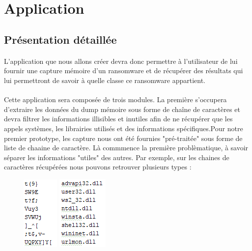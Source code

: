 \documentclass[a4paper, 12pt, twoside]{article}
\begin{document}
\section{Application}
\subsection{Présentation détaillée}

\paragraph{}
L'application que nous allons créer devra donc permettre à l'utilisateur de lui fournir une capture mémoire d'un ransomware et de récupérer des résultats qui lui permettront de savoir à quelle classe ce ransomware appartient.

\paragraph{}
Cette application sera composée de trois modules.
La première s’occupera d’extraire les données du dump mémoire sous forme de chaîne de caractères et devra filtrer les informations illisibles et inutiles afin de ne récupérer que les appels systèmes, les librairies utilisés et des informations spécifiques.Pour notre premier prototype, les capture nous ont été fournies "pré-traitée" sous forme de liste de chaaine de caractère. Là commmence la première problèmatique, à savoir séparer les informations "utiles" des autres. Par exemple, sur les chaines de caractères récupérées nous pouvons retrouver plusieurs types : 

\begin{figure}[h]
    \begin{minipage}[c]{.46\linewidth}
        \centering
        \includegraphics{Capture1.PNG}
        \caption{}
    \end{minipage}
    \hfill%
    \begin{minipage}[c]{.46\linewidth}
        \centering
        \includegraphics{Capture2.PNG}
        \caption{}
    \end{minipage}
\end{figure}
\end{document}
